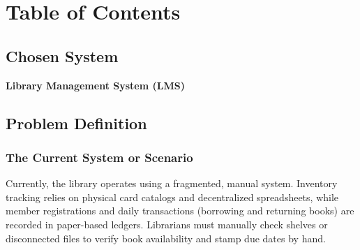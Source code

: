 \documentclass{thesis-library}
\begin{document}
\newcommand{\thesisTitle}{Library Management System (LMS)\\[0.3cm]\large Phase 1: Project Proposal \& Requirements}
\newcommand{\byLabel}{By:}
\newcommand{\studentName}{\begin{tabular}{c}Yousef Kitaneh (202311043)\\ Mohammed Abudaqqa (202310896)\\ Nasser basheer (202312323)\\ Mohammad Amin (202411102)\end{tabular}}
\newcommand{\supervisorLabel}{Instructor:}
\newcommand{\supervisorName}{Prof. Mohammad A. Shkoukani}
\newcommand{\degreeLineALabel}{Database Systems Administration}
\newcommand{\majorName}{}
\newcommand{\universityName}{Applied Science Private University}
\newcommand{\deanshipName}{Faculty of Information Technology}
\newcommand{\regionName}{Amman - Jordan}
\newcommand{\degreeyearName}{2026}
\newcommand{\degreemonthName}{November}

\makecoverpage


\newpage
\chapter*{\centering \Huge Table of Contents}
\tableofcontents
{}

\newpage
{}



\section{Chosen System}
\textbf{Library Management System (LMS)}

\section{Problem Definition}

\subsection{The Current System or Scenario}
Currently, the library operates using a fragmented, manual system. Inventory tracking relies on physical card catalogs and decentralized spreadsheets, while member registrations and daily transactions (borrowing and returning books) are recorded in paper-based ledgers. Librarians must manually check shelves or disconnected files to verify book availability and stamp due dates by hand.
\end{document}
